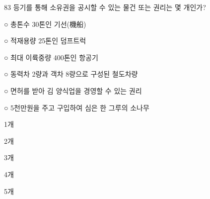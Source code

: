 \begin{question}{83}
등기를 통해 소유권을 공시할 수 있는 물건 또는 권리는 몇 개인가?
\begin{framedtext}
○ 총톤수 30톤인 기선(機船) \par
○ 적재용량 25톤인 덤프트럭 \par
○ 최대 이륙중량 400톤인 항공기 \par
○ 동력차 2량과 객차 8량으로 구성된 철도차량 \par
○ 면허를 받아 김 양식업을 경영할 수 있는 권리 \par
○ 5천만원을 주고 구입하여 심은 한 그루의 소나무 \par
\end{framedtext}
\begin{choices}
  \item 1개
  \item 2개
  \item 3개
  \item 4개
  \item 5개
\end{choices}
\end{question}
